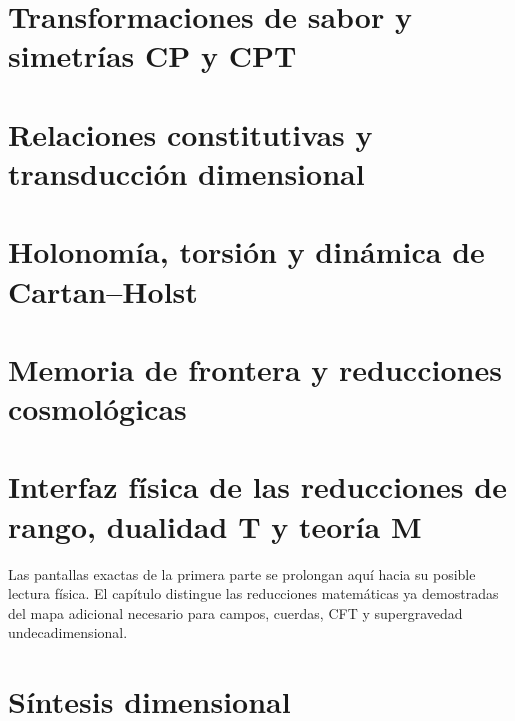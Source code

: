 \chapter{Transformaciones de sabor y simetrías CP y CPT}
\label{chap:ckm-cpt-rev7}
\HMTDemoteHeadings


\HMTRestoreHeadings

\chapter{Relaciones constitutivas y transducción dimensional}
\label{chap:constitutivas-rev7}
\HMTDemoteHeadings


\HMTRestoreHeadings

\chapter{Holonomía, torsión y dinámica de Cartan--Holst}
\label{chap:gravedad-rev7}
\HMTDemoteHeadings



\HMTRestoreHeadings

\chapter{Memoria de frontera y reducciones cosmológicas}
\label{chap:cosmologia-rev7}
\HMTDemoteHeadings





\HMTRestoreHeadings

\chapter{Interfaz física de las reducciones de rango, dualidad T y teoría M}
\label{chap:interfaz-m-rev7}
Las pantallas exactas de la primera parte se prolongan aquí hacia su posible
lectura física. El capítulo distingue las reducciones matemáticas ya
demostradas del mapa adicional necesario para campos, cuerdas, CFT y
supergravedad undecadimensional.
\HMTDemoteHeadings

\HMTRestoreHeadings

\chapter{Síntesis dimensional}
\label{chap:sintesis-md-rev7}
\HMTDemoteHeadings


\HMTRestoreHeadings
